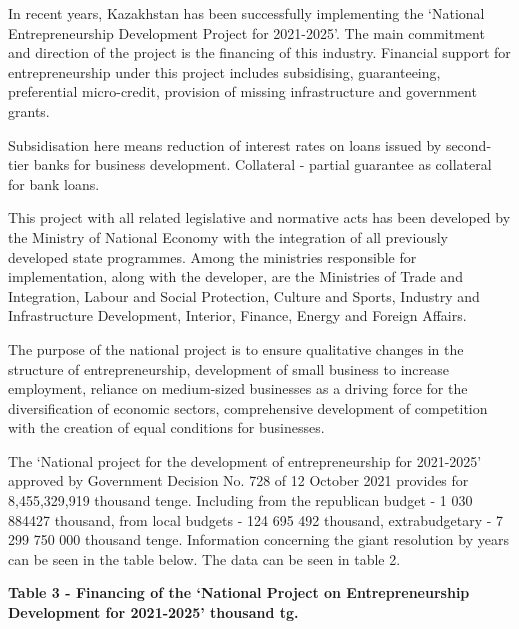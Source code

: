 \begin{multicols}{2}

In recent years, Kazakhstan has been successfully implementing the
`National Entrepreneurship Development Project for 2021-2025'. The main
commitment and direction of the project is the financing of this
industry. Financial support for entrepreneurship under this project
includes subsidising, guaranteeing, preferential micro-credit, provision
of missing infrastructure and government grants.

Subsidisation here means reduction of interest rates on loans issued by
second-tier banks for business development. Collateral - partial
guarantee as collateral for bank loans.

This project with all related legislative and normative acts has been
developed by the Ministry of National Economy with the integration of
all previously developed state programmes. Among the ministries
responsible for implementation, along with the developer, are the
Ministries of Trade and Integration, Labour and Social Protection,
Culture and Sports, Industry and Infrastructure Development, Interior,
Finance, Energy and Foreign Affairs.

The purpose of the national project is to ensure qualitative changes in
the structure of entrepreneurship, development of small business to
increase employment, reliance on medium-sized businesses as a driving
force for the diversification of economic sectors, comprehensive
development of competition with the creation of equal conditions for
businesses.

The `National project for the development of entrepreneurship for
2021-2025' approved by Government Decision No. 728 of 12 October 2021
provides for 8,455,329,919 thousand tenge. Including from the republican
budget - 1 030 884427 thousand, from local budgets - 124 695 492
thousand, extrabudgetary - 7 299 750 000 thousand tenge. Information
concerning the giant resolution by years can be seen in the table below.
The data can be seen in table 2.
\end{multicols}


{\bfseries Table 3 - Financing of the `National Project on Entrepreneurship
Development for 2021-2025' thousand tg.}

